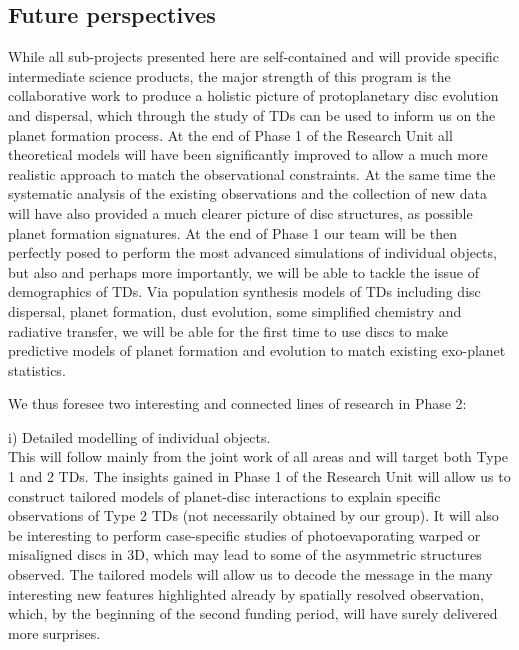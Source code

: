 \documentclass[10pt,fleqn,twoside]{article}
\begin{document}
\subsection{Future perspectives}
%
While all sub-projects presented here are self-contained and will
provide specific intermediate science products, the major strength of this program is the collaborative
work to produce a holistic picture of protoplanetary disc evolution
and dispersal, which through the study of TDs can be used
to inform us on the planet formation process. At the end of Phase 1 of
the Research Unit all theoretical models will have been significantly
improved to allow a much more realistic approach to match the
observational constraints. At the same time the systematic analysis of
the existing observations and the collection of new data will have also
provided a much clearer picture of disc structures, as possible planet
formation signatures. At the end of Phase 1 our team will be then
perfectly posed to perform the most advanced simulations of individual
objects, but also and perhaps more importantly, we will be able to
tackle the issue of demographics of TDs. Via population
synthesis models of TDs including disc dispersal, planet formation, dust
evolution, some simplified chemistry and radiative transfer, we will
be able for the first time to use discs to make predictive models of
planet formation and evolution to match existing exo-planet
statistics. 

We thus foresee two interesting and connected lines of research in Phase 2: 

i) Detailed modelling of individual objects.\\
This will follow mainly from the joint work of all areas and will
target both Type 1 and 2 TDs. The insights gained in
Phase 1 of the Research Unit will allow us to construct tailored
models of planet-disc interactions to explain specific observations of
Type 2 TDs (not necessarily obtained by our group). It will also be
interesting to perform case-specific studies of photoevaporating
warped or misaligned discs in 3D, which may
lead to some of the asymmetric structures observed. The tailored
models will allow us to decode the message in the many interesting new
features highlighted already by spatially resolved observation, which,
by the beginning of the second funding period, will have surely
delivered more surprises.  
\end{document}
